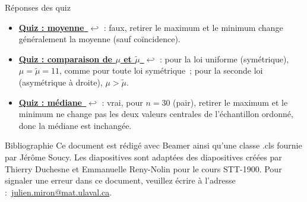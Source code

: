 \documentclass{BeamerTemplate}
\newcommand{\retour}[2]{\hyperlink{#1}{\textbf{#2}~{\color{gray}$\hookleftarrow$}}}
\begin{document}
\begin{frame}[t,label=rep-quiz]{Réponses des quiz}
\footnotesize
\begin{itemize}\itemsep3pt
\item \retour{quizmoy}{Quiz : moyenne} : faux, retirer le maximum et le minimum change généralement la
moyenne (sauf coïncidence).
\item \retour{quizmu}{Quiz : comparaison de $\mu$ et $\widetilde\mu$} : pour la loi uniforme (symétrique),
$\mu=\widetilde\mu=11$, comme pour toute loi symétrique~; pour la seconde loi (asymétrique à droite),
$\mu>\widetilde\mu$.
\item \retour{quizmed}{Quiz : médiane} : vrai, pour $n=30$ (pair), retirer le maximum et le minimum ne
change pas les deux valeurs centrales de l'échantillon ordonné, donc la médiane est inchangée.
\end{itemize}
\end{frame}


\begin{frame}{Bibliographie}
 	Ce document est rédigé avec Beamer ainsi qu'une classe .cls fournie par Jérôme Soucy. Les diapositives sont adaptées des diapositives créées par Thierry Duchesne et Emmanuelle Reny-Nolin pour le cours STT-1900.
 	\printbibliography
 	\vfill
 	\footnotesize Pour signaler une erreur dans ce document, veuillez écrire à l'adresse :~\href{mailto:julien.miron@mat.ulaval.ca}{julien.miron@mat.ulaval.ca}.
 \end{frame}
\end{document}

